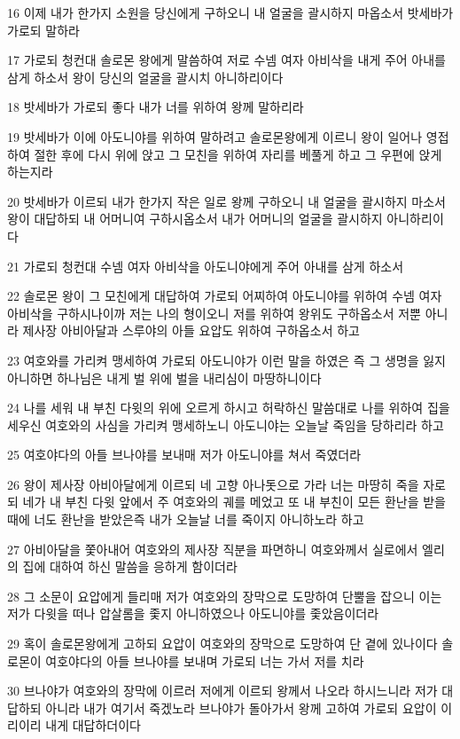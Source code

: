 \par 16 이제 내가 한가지 소원을 당신에게 구하오니 내 얼굴을 괄시하지 마옵소서 밧세바가 가로되 말하라
\par 17 가로되 청컨대 솔로몬 왕에게 말씀하여 저로 수넴 여자 아비삭을 내게 주어 아내를 삼게 하소서 왕이 당신의 얼굴을 괄시치 아니하리이다
\par 18 밧세바가 가로되 좋다 내가 너를 위하여 왕께 말하리라
\par 19 밧세바가 이에 아도니야를 위하여 말하려고 솔로몬왕에게 이르니 왕이 일어나 영접하여 절한 후에 다시 위에 앉고 그 모친을 위하여 자리를 베풀게 하고 그 우편에 앉게 하는지라
\par 20 밧세바가 이르되 내가 한가지 작은 일로 왕께 구하오니 내 얼굴을 괄시하지 마소서 왕이 대답하되 내 어머니여 구하시옵소서 내가 어머니의 얼굴을 괄시하지 아니하리이다
\par 21 가로되 청컨대 수넴 여자 아비삭을 아도니야에게 주어 아내를 삼게 하소서
\par 22 솔로몬 왕이 그 모친에게 대답하여 가로되 어찌하여 아도니야를 위하여 수넴 여자 아비삭을 구하시나이까 저는 나의 형이오니 저를 위하여 왕위도 구하옵소서 저뿐 아니라 제사장 아비아달과 스루야의 아들 요압도 위하여 구하옵소서 하고
\par 23 여호와를 가리켜 맹세하여 가로되 아도니야가 이런 말을 하였은 즉 그 생명을 잃지 아니하면 하나님은 내게 벌 위에 벌을 내리심이 마땅하니이다
\par 24 나를 세워 내 부친 다윗의 위에 오르게 하시고 허락하신 말씀대로 나를 위하여 집을 세우신 여호와의 사심을 가리켜 맹세하노니 아도니야는 오늘날 죽임을 당하리라 하고
\par 25 여호야다의 아들 브나야를 보내매 저가 아도니야를 쳐서 죽였더라
\par 26 왕이 제사장 아비아달에게 이르되 네 고향 아나돗으로 가라 너는 마땅히 죽을 자로되 네가 내 부친 다윗 앞에서 주 여호와의 궤를 메었고 또 내 부친이 모든 환난을 받을 때에 너도 환난을 받았은즉 내가 오늘날 너를 죽이지 아니하노라 하고
\par 27 아비아달을 쫓아내어 여호와의 제사장 직분을 파면하니 여호와께서 실로에서 엘리의 집에 대하여 하신 말씀을 응하게 함이더라
\par 28 그 소문이 요압에게 들리매 저가 여호와의 장막으로 도망하여 단뿔을 잡으니 이는 저가 다윗을 떠나 압살롬을 좇지 아니하였으나 아도니야를 좇았음이더라
\par 29 혹이 솔로몬왕에게 고하되 요압이 여호와의 장막으로 도망하여 단 곁에 있나이다 솔로몬이 여호야다의 아들 브나야를 보내며 가로되 너는 가서 저를 치라
\par 30 브나야가 여호와의 장막에 이르러 저에게 이르되 왕께서 나오라 하시느니라 저가 대답하되 아니라 내가 여기서 죽겠노라 브나야가 돌아가서 왕께 고하여 가로되 요압이 이리이리 내게 대답하더이다
